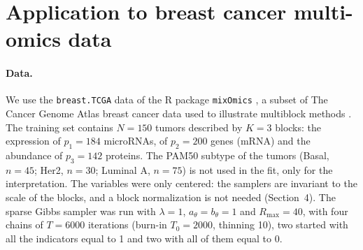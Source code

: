 \documentclass[11pt]{article}
\begin{document}
\section{Application to breast cancer multi-omics data}\label{sec:appli}
 
\paragraph{Data.} We use the \texttt{breast.TCGA} data of the \textsf{R} package \texttt{mixOmics} \citep{rohart2017}, a subset of The Cancer Genome Atlas breast cancer data \citep{tcga2012} used to illustrate multiblock methods \citep{singh2019}. The training set contains $N=150$ tumors described by $K=3$ blocks: the expression of $p_1=184$ microRNAs, of $p_2=200$ genes (mRNA) and the abundance of $p_3=142$ proteins. The PAM50 subtype of the tumors (Basal, $n=45$; Her2, $n=30$; Luminal A, $n=75$) is not used in the fit, only for the interpretation. The variables were only centered: the samplers are invariant to the scale of the blocks, and a block normalization is not needed (Section~4). The sparse Gibbs sampler was run with $\lambda=1$, $a_\theta=b_\theta=1$ and $R_{\max}=40$, with four chains of $T=6000$ iterations (burn-in $T_0=2000$, thinning 10), two started with all the indicators equal to 1 and two with all of them equal to 0.
 
\end{document}
